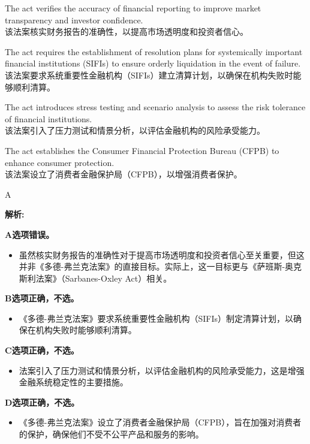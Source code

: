 \documentclass{article}
\newenvironment{explanation}
{\textbf{解析:}\par}
{\par}
\begin{document}
    \begin{choices}
    \item The act verifies the accuracy of financial reporting to improve market transparency and investor confidence. \\
    该法案核实财务报告的准确性，以提高市场透明度和投资者信心。
    
    \item The act requires the establishment of resolution plans for systemically important financial institutions (SIFIs) to ensure orderly liquidation in the event of failure. \\
    该法案要求系统重要性金融机构（SIFIs）建立清算计划，以确保在机构失败时能够顺利清算。
    
    \item The act introduces stress testing and scenario analysis to assess the risk tolerance of financial institutions. \\
    该法案引入了压力测试和情景分析，以评估金融机构的风险承受能力。
    
    \item The act establishes the Consumer Financial Protection Bureau (CFPB) to enhance consumer protection. \\
    该法案设立了消费者金融保护局（CFPB），以增强消费者保护。
    \end{choices}
    
    \begin{correctanswer}
    A
    \end{correctanswer}
    
    \begin{explanation}
        \textbf{A选项错误。}
        \begin{itemize}
            \item 虽然核实财务报告的准确性对于提高市场透明度和投资者信心至关重要，但这并非《多德-弗兰克法案》的直接目标。实际上，这一目标更与《萨班斯-奥克斯利法案》（Sarbanes-Oxley Act）相关。
        \end{itemize}
        
        \textbf{B选项正确，不选。}
        \begin{itemize}
            \item 《多德-弗兰克法案》要求系统重要性金融机构（SIFIs）制定清算计划，以确保在机构失败时能够顺利清算。
        \end{itemize}
        
        \textbf{C选项正确，不选。}
        \begin{itemize}
            \item 法案引入了压力测试和情景分析，以评估金融机构的风险承受能力，这是增强金融系统稳定性的主要措施。
        \end{itemize}
        
        \textbf{D选项正确，不选。}
        \begin{itemize}
            \item 《多德-弗兰克法案》设立了消费者金融保护局（CFPB），旨在加强对消费者的保护，确保他们不受不公平产品和服务的影响。
        \end{itemize}
        \end{explanation}
    
\end{document}
